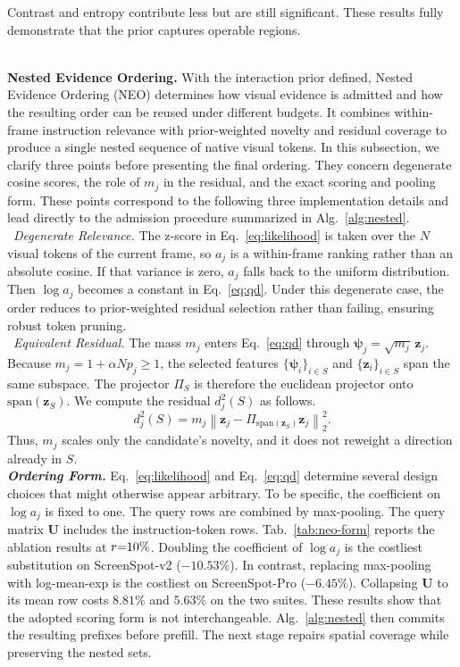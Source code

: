 %
Contrast and entropy contribute less but are still significant.
%
These results fully demonstrate that the prior captures operable regions.

\\
\noindent\textbf{Nested Evidence Ordering.}
With the interaction prior defined, Nested Evidence Ordering (NEO) determines how visual evidence is admitted and how the resulting order can be reused under different budgets.
It combines within-frame instruction relevance with prior-weighted novelty and residual coverage to produce a single nested sequence of native visual tokens.
In this subsection, we clarify three points before presenting the final ordering.
%
They concern degenerate cosine scores, the role of $m_j$ in the residual, and the exact scoring and pooling form.
These points correspond to the following three implementation details and lead directly to the admission procedure summarized in Alg.~\ref{alg:nested}.
\\
\noindent{}~\textit{Degenerate Relevance.}
The z-score in Eq.~\ref{eq:likelihood} is taken over the $N$ visual tokens of the current frame, so $a_j$ is a within-frame ranking rather than an absolute cosine.
%
If that variance is zero, $a_j$ falls back to the uniform distribution.
%
Then $\log a_j$ becomes a constant in Eq.~\ref{eq:qd}.
%
Under this degenerate case, the order reduces to prior-weighted residual selection rather than failing, ensuring robust token pruning.
\\
\noindent{}~\textit{Equivalent Residual.}
The mass $m_j$ enters Eq.~\ref{eq:qd} through $\boldsymbol\psi_j=\sqrt{m_j}\,\mathbf z_j$.
%
Because $m_j=1+\alpha Np_j\geq 1$, the selected features $\{\boldsymbol\psi_i\}_{i\in S}$ and $\{\mathbf z_i\}_{i\in S}$ span the same subspace.
%
The projector $\Pi_S$ is therefore the euclidean projector onto $\mathrm{span}(\mathbf z_S)$.
%
We compute the residual $d_j^2(S)$ as follows.
\begin{equation}
d_j^2(S)
=
m_j
\left\lVert
\mathbf z_j-\Pi_{\mathrm{span}(\mathbf z_S)}\mathbf z_j
\right\rVert_2^2 .
\label{eq:mass-residual}
\end{equation}
Thus, $m_j$ scales only the candidate's novelty, and it does not reweight a direction already in $S$.
\\
\noindent\textbf{\textit{Ordering Form.}}
Eq.~\ref{eq:likelihood} and Eq.~\ref{eq:qd} determine several design choices that might otherwise appear arbitrary.
%
To be specific, the coefficient on $\log a_j$ is fixed to one.
%
The query rows are combined by max-pooling.
%
The query matrix $\mathbf U$ includes the instruction-token rows.
%
Tab.~\ref{tab:neo-form} reports the ablation results at $r{=}10\%$.
%
Doubling the coefficient of $\log a_j$ is the costliest substitution on ScreenSpot-v2 ($-10.53\%$).
%
In contrast, replacing max-pooling with log-mean-exp is the costliest on ScreenSpot-Pro ($-6.45\%$).
%
Collapsing $\mathbf U$ to its mean row costs $8.81\%$ and $5.63\%$ on the two suites.
%
These results show that the adopted scoring form is not interchangeable.
%
Alg.~\ref{alg:nested} then commits the resulting prefixes before prefill.
%
The next stage repairs spatial coverage while preserving the nested sets.


